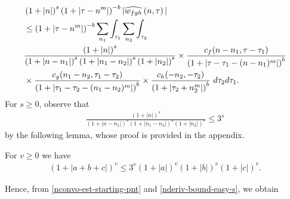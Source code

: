 \begin{equation}
	\label{nconvo-est-starting-pnt}
	\begin{split}
		 & \left (1 + |n| \right )^s \left( 1 + | \tau - n^{m } | \right)^{-b} | \widehat{w_{fgh}}\left( 
		n, \tau \right) |
		\\
		& \le \left( 1 + | \tau - n^{m } | \right)^{-b}
    \sum_{n_{1} } \int_{\tau_{1}} \sum_{n_{2}}
    \int_{\tau_{2}}     \\
    & \frac{\left (1 + |n| \right )^s}{\left (1 +
		|n - n_{1}| \right )^s \left (1 + | n_1 - n_2| \right )^s \left (1 + |n_{2}| \right )^s} 
		\times \frac{c_f(n - n_{1}, \tau - \tau_1)}{\left( 1 + | \tau - \tau_1 - (n - n_{1})^{m } | 
		\right)^{b}}
		\\
		& \times
		\frac{c_g(n_1 - n_2, \tau_1 - \tau_2)}{\left( 1 + | \tau_1 - \tau_2 - (n_1 - n_2)^{m } | 
		\right)^{b}} \times
		\frac{c_h(-n_{2}, -\tau_2)}{\left( 1 + | \tau_2 + n_{2}^{m } | 
		\right)^{b}}\ d \tau_2 d \tau_1 .
	\end{split}
\end{equation}
%
%
For $s \ge 0$, observe that
%
%
\begin{equation}
	\label{nderiv-bound-easy-s}
	\begin{split}
		\frac{\left (1 + |n| \right ) ^s}{\left (1 + |n - n_{1}| \right ) ^s \left (1 + |n_1 - n_2| \right ) ^s \left (1 + |n_2| \right ) ^s} 
		\le 3^{s}
	\end{split}
\end{equation}
%
%
by the following lemma, whose proof is provided in the appendix.
%
%
\begin{lemma}
\label{nlem:splitting}
	For $v \ge 0$ we have
%
%
\begin{equation}
	\label{nsplitting}
	\begin{split}
		\left ( 1 + |a +b + c| \right)^v \le 3^v \left(1 + | a | \right)^v \left(
		1 + | b | \right)^v \left( 1 + | c | \right)^v.
	\end{split}
\end{equation}
%
%
\end{lemma}
%
%
Hence, from \eqref{nconvo-est-starting-pnt} and \eqref{nderiv-bound-easy-s}, we 
obtain
%
